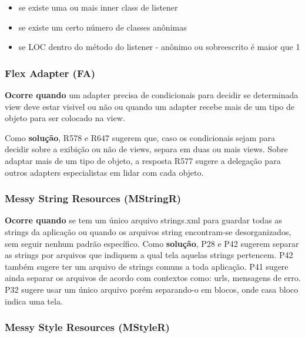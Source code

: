 \begin{itemize} 
	\item[$\circ$] [n\'ivel 4] se existe uma ou mais inner class de listener
	\item[$\circ$] [n\'ivel 3] se existe um certo n\'umero de classes an\^onimas
	\item[$\circ$] [n\'ivel 2 e 3] se LOC dentro do m\'etodo do listener - an\^onimo ou sobreescrito \'e maior que 1
\end{itemize}


\subsubsection{Flex Adapter (FA)}

\textbf{Ocorre quando} um adapter precisa de condicionais para decidir se determinada view deve estar visivel ou n\~ao ou quando um adapter recebe mais de um tipo de objeto para ser colocado na view.

Como \textbf{solu\c{c}\~ao}, R578 e R647 sugerem que, caso os condicionais sejam para decidir sobre a exibi\c{c}\~ao ou n\~ao de views, separa em duas ou mais views. Sobre adaptar mais de um tipo de objeto, a resposta R577 sugere a delega\c{c}\~ao para outros adapters especialistas em lidar com cada objeto.




\subsubsection{Messy String Resources (MStringR)} 

\textbf{Ocorre quando} se tem um \'unico arquivo strings.xml para guardar todas as strings da aplica\c{c}\~ao ou quando os arquivos string encontram-se desorganizados, sem seguir nenhum padr\~ao espec\'ifico. Como \textbf{solu\c{c}\~ao}, P28 e P42 sugerem separar as strings por arquivos que indiquem a qual tela aquelas strings pertencem. P42 tamb\'em sugere ter um arquivo de strings comuns a toda aplica\c{c}\~ao. P41 sugere ainda separar os arquivos de acordo com contextos como: urls, mensagens de erro. P32 sugere usar um \'unico arquivo por\'em separando-o em blocos, onde casa bloco indica uma tela.



\subsubsection{Messy Style Resources (MStyleR)} 

